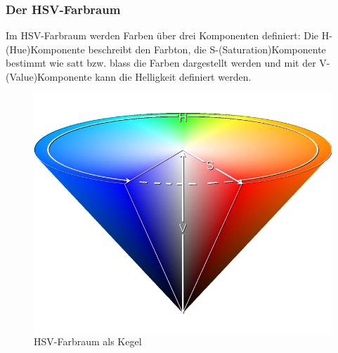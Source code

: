 \documentclass[a4paper,12pt]{article}
\begin{document}
\subsubsection{Der HSV-Farbraum}
Im HSV-Farbraum werden Farben über drei Komponenten definiert:
Die H-(Hue)Komponente beschreibt den Farbton, die S-(Saturation)Komponente bestimmt wie satt bzw.
blass die Farben dargestellt werden und mit der V-(Value)Komponente kann die Helligkeit definiert werden.
\begin{figure}[H]
    \includegraphics[scale=0.3]{hsv-farbraum.png}
    \caption{HSV-Farbraum als Kegel}
    \label{fig:hsv-farbraum}
\end{figure}
\end{document}
